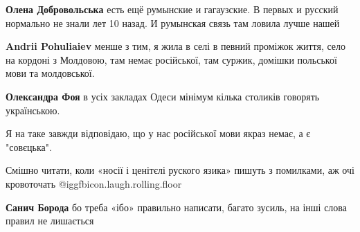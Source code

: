\begin{itemize}
{\begin{itemize}
{\textbf{Олена Добровольська} есть ещё румынские и гагаузские. В первых и русский нормально не знали лет 10 назад. И румынская связь там ловила лучше нашей

 
\textbf{Andrii Pohuliaiev} менше з тим, я жила в селі в певний проміжок життя, село на кордоні з Молдовою, там немає російської, там суржик, домішки польської мови та молдовської.

 
\textbf{Олександра Фоя} в усіх закладах Одеси мінімум кілька столиків говорять українською.
}\end{itemize}

 
Я на таке завжди відповідаю, що у нас російської мови якраз немає, а є "совєцька".

 
Смішно читати, коли «носії і ценітєлі руского язика» пишуть з помилками, аж очі кровоточать  @igg{fbicon.laugh.rolling.floor} 

\begin{itemize}{
 
\textbf{Санич Борода} бо треба «ібо» правильно написати, багато зусиль, на інші слова правил не лишається
}\end{itemize}

}
\end{itemize}
